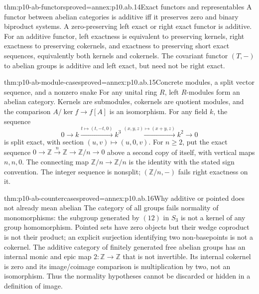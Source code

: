 \begin{hbtheorem}{thm:p10-ab-functors}{proved=annex:p10.ab.14}{Exact functors and representables}
A functor between abelian categories is additive iff it preserves zero
and binary biproduct systems. A zero-preserving left exact or right exact
functor is additive. For an additive functor, left exactness is equivalent
to preserving kernels, right exactness to preserving cokernels, and
exactness to preserving short exact sequences, equivalently both kernels
and cokernels. The covariant functor \((T,-)\) to abelian groups is
additive and left exact, but need not be right exact.
\end{hbtheorem}

\begin{hbtheorem}{thm:p10-ab-module-cases}{proved=annex:p10.ab.15}{Concrete modules, a split vector sequence, and a nonzero snake}
For any unital ring \(R\), left \(R\)-modules form an abelian category.
Kernels are submodules, cokernels are quotient modules, and the comparison
\(A/\ker f\to f[A]\) is an isomorphism.
For any field \(k\), the sequence
\[
 0\to k\xrightarrow{t\mapsto(t,-t,0)} k^3
 \xrightarrow{(x,y,z)\mapsto(x+y,z)} k^2\to0
\]
is split exact, with section \((u,v)\mapsto(u,0,v)\).
For \(n\geq2\), put the exact sequence
\(0\to\mathbb Z\xrightarrow n\mathbb Z\to\mathbb Z/n\to0\)
above a second copy of itself, with vertical maps \(n,n,0\).
The connecting map \(\mathbb Z/n\to\mathbb Z/n\) is the identity
with the stated sign convention. The integer sequence is nonsplit;
\((\mathbb Z/n,-)\) fails right exactness on it.
\end{hbtheorem}

\begin{hbtheorem}{thm:p10-ab-countercases}{proved=annex:p10.ab.16}{Why additive or pointed does not already mean abelian}
The category of all groups fails normality of monomorphisms: the subgroup
generated by \((12)\) in \(S_3\) is not a kernel of any group homomorphism.
Pointed sets have zero objects but their wedge coproduct is not their
product; an explicit surjection identifying two non-basepoints is not a
cokernel. The additive category of finitely generated free abelian groups
has an internal monic and epic map \(2:\mathbb Z\to\mathbb Z\) that
is not invertible. Its internal cokernel is zero and its image/coimage
comparison is multiplication by two, not an isomorphism. Thus the
normality hypotheses cannot be discarded or hidden in a definition of image.
\end{hbtheorem}

